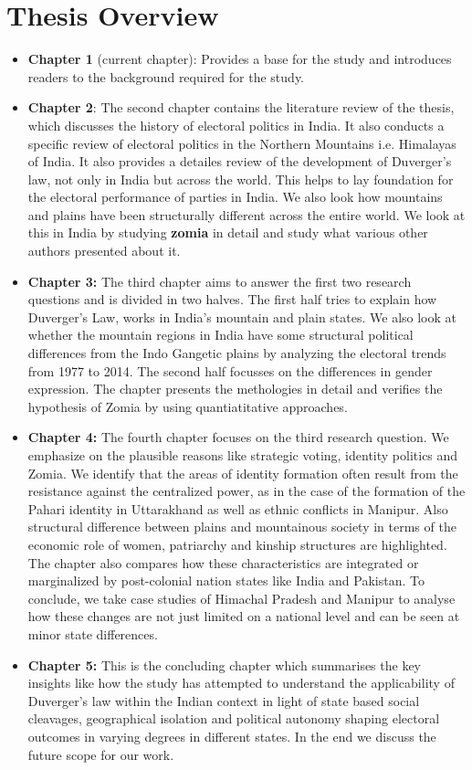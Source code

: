 \section{Thesis Overview}

\begin{itemize}
    \item \textbf{Chapter 1} (current chapter): Provides a base for the study and introduces readers to the background required for the study.
    \item \textbf{Chapter 2}: The second chapter contains the literature review of the thesis, which discusses the history of electoral politics in India. It also conducts a specific review of electoral politics in the Northern Mountains i.e. Himalayas of India. It also provides a detailes review of the development of Duverger's law, not only in India but across the world. This helps to lay foundation for the electoral performance of parties in India. We also look how mountains and plains have been structurally different across the entire world. We look at this in India by studying \textbf{zomia} in detail and study what various other authors presented about it.
    \item \textbf{Chapter 3:} The third chapter aims to answer the first two research questions and is divided in two halves. The first half tries to explain how Duverger's Law, works in India's mountain and plain states. We also look at whether the mountain regions in India have some structural political differences from the Indo Gangetic plains by analyzing the electoral trends from 1977 to 2014. The second half focusses on the differences in gender expression. The chapter presents the methologies in detail and verifies the hypothesis of Zomia by using quantiatitative approaches.
    \item \textbf{Chapter 4:} The fourth chapter focuses on the third research question. We emphasize on the plausible reasons like strategic voting, identity politics and Zomia. We identify that the areas of identity formation often result from the resistance against the centralized power, as in the case of the formation of the Pahari identity in Uttarakhand as well as ethnic conflicts in Manipur. Also structural difference between plains and mountainous society in terms of the economic role of women, patriarchy and kinship structures are highlighted. The chapter also compares how these characteristics are integrated or marginalized by post-colonial nation states like India and Pakistan. To conclude, we take case studies of Himachal Pradesh and Manipur to analyse how these changes are not just limited on a national level and can be seen at minor state differences.
    \item \textbf{Chapter 5:} This is the concluding chapter which summarises the key insights like how the study  has attempted to understand the applicability of Duverger's law within the Indian context in light of state based social cleavages, geographical isolation and political autonomy shaping electoral outcomes in varying degrees in different states. In the end we discuss the future scope for our work.
\end{itemize}